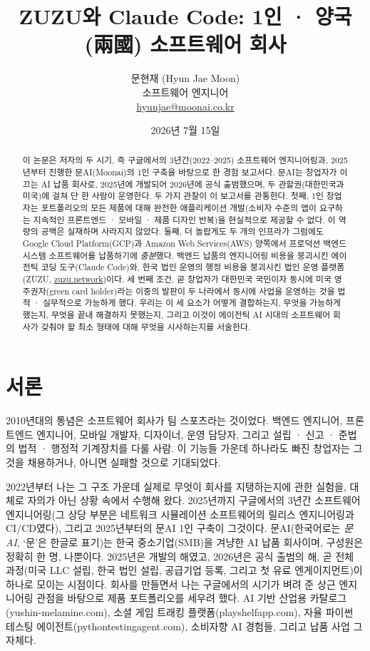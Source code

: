 \documentclass{article}
\title{ZUZU와 Claude Code: 1인 · 양국(兩國) 소프트웨어 회사}
\author{문현재 (Hyun Jae Moon) \\ \small 소프트웨어 엔지니어 \\ \small \href{mailto:hyunjae@moonai.co.kr}{hyunjae@moonai.co.kr}}
\date{2026년 7월 15일}
\begin{document}
\maketitle

\begin{abstract}
이 논문은 저자의 두 시기, 즉 구글에서의 3년간(2022--2025) 소프트웨어 엔지니어링과, 2025년부터 진행한 문AI(Moonai)의 1인 구축을 바탕으로 한 경험 보고서다. 문AI는 창업자가 이끄는 AI 납품 회사로, 2025년에 개발되어 2026년에 공식 출범했으며, 두 관할권(대한민국과 미국)에 걸쳐 단 한 사람이 운영한다. 두 가지 관찰이 이 보고서를 관통한다. 첫째, 1인 창업자는 포트폴리오의 모든 제품에 대해 완전한 애플리케이션 개발(소비자 수준의 앱이 요구하는 지속적인 프론트엔드 · 모바일 · 제품 디자인 반복)을 현실적으로 제공할 수 없다. 이 역량의 공백은 실재하며 사라지지 않았다. 둘째, 더 놀랍게도 두 개의 인프라가 그럼에도 Google Cloud Platform(GCP)과 Amazon Web Services(AWS) 양쪽에서 프로덕션 백엔드 시스템 소프트웨어를 납품하기에 \emph{충분}했다. 백엔드 납품의 엔지니어링 비용을 붕괴시킨 에이전틱 코딩 도구(Claude Code)와, 한국 법인 운영의 행정 비용을 붕괴시킨 법인 운영 플랫폼(ZUZU, \href{https://zuzu.network}{zuzu.network})이다. 세 번째 조건, 곧 창업자가 대한민국 국민이자 동시에 미국 영주권자(green card holder)라는 이중의 발판이 두 나라에서 동시에 사업을 운영하는 것을 법적 · 실무적으로 가능하게 했다. 우리는 이 세 요소가 어떻게 결합하는지, 무엇을 가능하게 했는지, 무엇을 끝내 해결하지 못했는지, 그리고 이것이 에이전틱 AI 시대의 소프트웨어 회사가 갖춰야 할 최소 형태에 대해 무엇을 시사하는지를 서술한다.
\end{abstract}

\section{서론}

2010년대의 통념은 소프트웨어 회사가 팀 스포츠라는 것이었다. 백엔드 엔지니어, 프론트엔드 엔지니어, 모바일 개발자, 디자이너, 운영 담당자, 그리고 설립 · 신고 · 준법의 법적 · 행정적 기계장치를 다룰 사람. 이 기능들 가운데 하나라도 빠진 창업자는 그것을 채용하거나, 아니면 실패할 것으로 기대되었다.

2022년부터 나는 그 구조 가운데 실제로 무엇이 회사를 지탱하는지에 관한 실험을, 대체로 자의가 아닌 상황 속에서 수행해 왔다. 2025년까지 구글에서의 3년간 소프트웨어 엔지니어링(그 상당 부분은 네트워크 시뮬레이션 소프트웨어의 릴리스 엔지니어링과 CI/CD였다), 그리고 2025년부터의 문AI 1인 구축이 그것이다. 문AI(한국어로는 \emph{문AI}, `문'은 한글로 표기)는 한국 중소기업(SMB)을 겨냥한 AI 납품 회사이며, 구성원은 정확히 한 명, 나뿐이다. 2025년은 개발의 해였고, 2026년은 공식 출범의 해, 곧 전체 과정(미국 LLC 설립, 한국 법인 설립, 공급기업 등록, 그리고 첫 유료 엔게이지먼트)이 하나로 모이는 시점이다. 회사를 만들면서 나는 구글에서의 시기가 벼려 준 상근 엔지니어링 관점을 바탕으로 제품 포트폴리오를 세우려 했다. AI 기반 산업용 카탈로그(yushin-melamine.com), 소셜 게임 트래킹 플랫폼(playshelfapp.com), 자율 파이썬 테스팅 에이전트(pythontestingagent.com), 소비자향 AI 경험들, 그리고 납품 사업 그 자체다.
\end{document}
